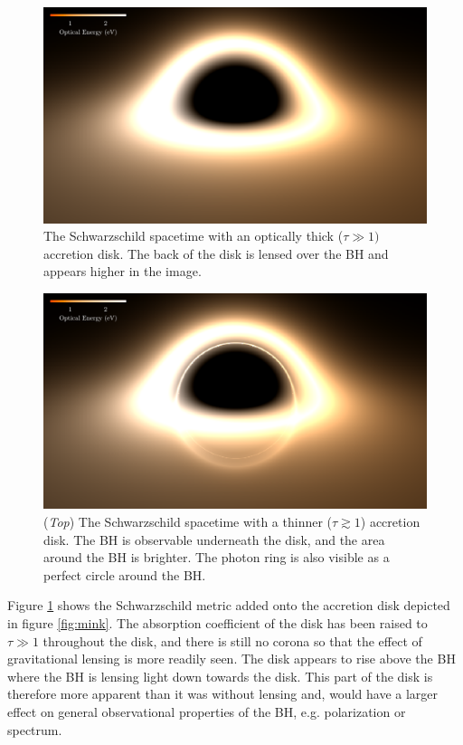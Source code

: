\documentclass[twocolumn,twocolappendix]{aastex631}
\begin{document}
\begin{figure}
  \centering
  \includegraphics[width=\linewidth]{../imager/small/thick-optical.pdf}
  \caption{The Schwarzschild spacetime with an optically thick ($\tau \gg 1)$ accretion disk. The back of the disk is lensed over the BH and appears higher in the image.}
  \label{fig:thick}
\end{figure}

\begin{figure}[htbp!]
  \centering
  \includegraphics[width=\linewidth]{../imager/small/thin-optical.pdf}
  \caption{(\textit{Top}) The Schwarzschild spacetime with a thinner ($\tau \gtrsim 1$) accretion disk. The BH is observable underneath the disk, and the area around the BH is brighter. The photon ring is also visible as a perfect circle around the BH.}
  \label{fig:thin}
\end{figure}

Figure \ref{fig:thick} shows the Schwarzschild metric added onto the accretion disk depicted in figure \ref{fig:mink}. The absorption coefficient of the disk has been raised to $\tau \gg 1$ throughout the disk, and there is still no corona so that the effect of gravitational lensing is more readily seen. The disk appears to rise above the BH where the BH is lensing light down towards the disk. This part of the disk is therefore more apparent than it was without lensing and, would have a larger effect on general observational properties of the BH, e.g. polarization or spectrum.
\end{document}
